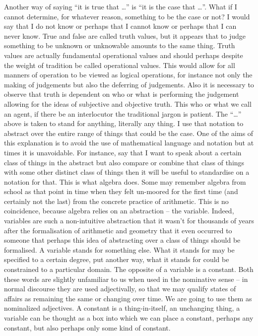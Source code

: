 \documentclass[dah,phd,a4paper]{xe_uccthesis}
\begin{document}
Another way of saying “it is true that …” is “it is the case that …”. What if I cannot determine, for whatever reason, something to be the case or not? I would say that I do not know or perhaps that I cannot know or perhaps that I can never know. True and false are called truth values, but it appears that to judge something to be unknown or unknowable amounts to the same thing. Truth values are actually fundamental operational values and should perhaps despite the weight of tradition be called operational values. This would allow for all manners of operation to be viewed as logical operations, for instance not only the making of judgements but also the deferring of judgements. Also it is necessary to observe that truth is dependent on who or what is performing the judgement allowing for the ideas of subjective and objective truth. This who or what we call an agent, if there be an interlocutor the traditional jargon is patient.
The “…” above is taken to stand for anything, literally any thing. I use that notation to abstract over the entire range of things that could be the case. One of the aims of this explanation is to avoid the use of mathematical language and notation but at times it is unavoidable. For instance, say that I want to speak about a certain class of things in the abstract but also compare or combine that class of things with some other distinct class of things then it will be useful to standardise on a notation for that.
This is what algebra does.
Some may remember algebra from school as that point in time when they felt un-moored for the first time (and certainly not the last) from the concrete practice of arithmetic. This is no coincidence, because algebra relies on an abstraction – the variable. Indeed, variables are such a non-intuitive abstraction that it wasn't for thousands of years after the formalisation of arithmetic and geometry that it even occurred to someone that perhaps this idea of abstracting over a class of things should be formalised. A variable stands for something else. What it stands for may be specified to a certain degree, put another way, what it stands for could be constrained to a particular domain. The opposite of a variable is a constant. Both these words are slightly unfamiliar to us when used in the nominative sense – in normal discourse they are used adjectivally, so that we may qualify states of affairs as remaining the same or changing over time. We are going to use them as nominalized adjectives. A constant is a thing-in-itself, an unchanging thing, a variable can be thought as a box into which we can place a constant, perhaps any constant, but also perhaps only some kind of constant.
\end{document}
